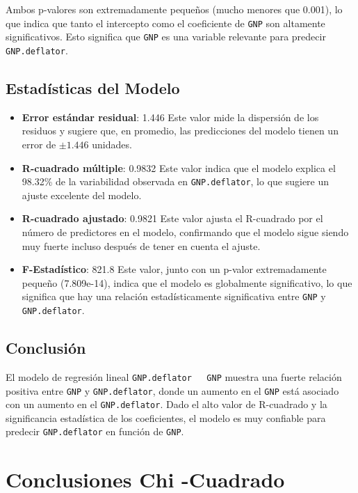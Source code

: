 \documentclass{article}
\begin{document}
Ambos p-valores son extremadamente pequeños (mucho menores que 0.001), lo que indica que tanto el intercepto como el coeficiente de \texttt{GNP} son altamente significativos. Esto significa que \texttt{GNP} es una variable relevante para predecir \texttt{GNP.deflator}.

\subsection*{Estadísticas del Modelo}
\begin{itemize}
    \item \textbf{Error estándar residual}: 1.446  
    Este valor mide la dispersión de los residuos y sugiere que, en promedio, las predicciones del modelo tienen un error de $\pm1.446$ unidades.

    \item \textbf{R-cuadrado múltiple}: 0.9832  
    Este valor indica que el modelo explica el 98.32\% de la variabilidad observada en \texttt{GNP.deflator}, lo que sugiere un ajuste excelente del modelo.

    \item \textbf{R-cuadrado ajustado}: 0.9821  
    Este valor ajusta el R-cuadrado por el número de predictores en el modelo, confirmando que el modelo sigue siendo muy fuerte incluso después de tener en cuenta el ajuste.

    \item \textbf{F-Estadístico}: 821.8  
    Este valor, junto con un p-valor extremadamente pequeño (7.809e-14), indica que el modelo es globalmente significativo, lo que significa que hay una relación estadísticamente significativa entre \texttt{GNP} y \texttt{GNP.deflator}.
\end{itemize}

\subsection*{Conclusión}
El modelo de regresión lineal \texttt{GNP.deflator ~ GNP} muestra una fuerte relación positiva entre \texttt{GNP} y \texttt{GNP.deflator}, donde un aumento en el \texttt{GNP} está asociado con un aumento en el \texttt{GNP.deflator}. Dado el alto valor de R-cuadrado y la significancia estadística de los coeficientes, el modelo es muy confiable para predecir \texttt{GNP.deflator} en función de \texttt{GNP}.




\section{Conclusiones Chi -Cuadrado}
\end{document}
